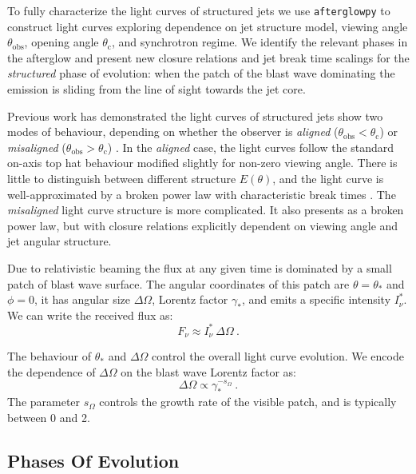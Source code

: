 \documentclass[twocolumn]{aastex62}
\newcommand{\afterglowpy}{{\tt afterglowpy}}
\newcommand{\thobs}{\ensuremath{\theta_{\mathrm{obs}}}}
\newcommand{\thC}{\ensuremath{\theta_{\mathrm{c}}}}
\newcommand{\som}{\ensuremath{s_{\Omega}}}
\begin{document}
To fully characterize the light curves of structured jets we use \afterglowpy{} to construct light curves exploring dependence on jet structure model, viewing angle $\thobs$, opening angle $\thC$, and synchrotron regime.  We identify the relevant phases in the afterglow and present new closure relations and jet break time scalings for the \emph{structured} phase of evolution: when the patch of the blast wave dominating the emission is sliding from the line of sight towards the jet core.

Previous work has demonstrated the light curves of structured jets show two modes of behaviour, depending on whether the observer is \emph{aligned} ($\thobs < \thC$) or \emph{misaligned} ($\thobs > \thC$) \citep{Rossi:2002aa, Granot:2002ab, Panaitescu:2003aa, van-Eerten:2010aa}.
In the \emph{aligned} case, the light curves follow the standard on-axis top hat behaviour modified slightly for non-zero viewing angle.  There is little to distinguish between different structure $E(\theta)$, and the light curve is well-approximated by a broken power law with characteristic break times \citep{Granot:2002aa}.  The \emph{misaligned} light curve structure is more complicated.  It also presents as a broken power law, but with closure relations explicitly dependent on viewing angle and jet angular structure.  

Due to relativistic beaming the flux at any given time is dominated by a small patch of blast wave surface.  The angular coordinates of this patch are $\theta = \theta_*$ and $\phi=0$, it has angular size $\Delta \Omega$, Lorentz factor $\gamma_*$, and emits a specific intensity $I_\nu^*$. We can write the received flux as:
\begin{equation}
	F_\nu \approx I_\nu^*\ \Delta \Omega\ .
\end{equation}

The behaviour of $\theta_*$ and $\Delta \Omega$ control the overall light curve evolution.  We encode the dependence of $\Delta \Omega$ on the blast wave Lorentz factor as:
\begin{equation}
	\Delta \Omega \propto \gamma_*^{-\som} \ .
\end{equation}
The parameter $\som$ controls the growth rate of the visible patch, and is typically between 0 and 2. 

\subsection{Phases Of Evolution} \label{subsec:phases}
\end{document}
